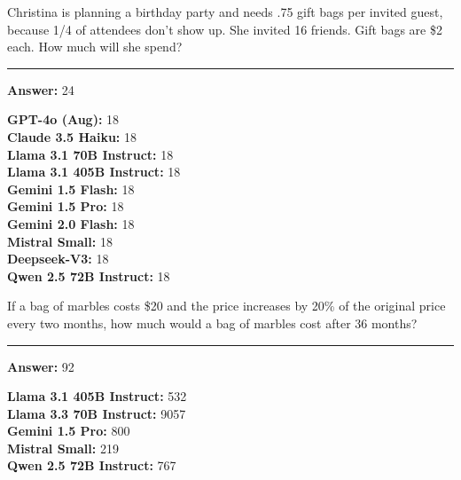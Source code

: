 \begin{tcolorbox}[colback=gray!3, colframe=gray!50, arc=2mm, boxrule=0.5pt, title={\textit{GSM8K}}, coltitle=black, colbacktitle=gray!20]
    
    Christina is planning a birthday party and needs .75 gift bags per invited guest, because 1/4 of attendees don't show up. She invited 16 friends. Gift bags are \$2 each. How much will she spend?

    \noindent
    \begin{center}
        \rule{0.9\textwidth}{0.4pt}
    \end{center}
    
    \textbf{Answer:} 24

    \medskip

    \textbf{GPT-4o (Aug):} 18 \\
    \textbf{Claude 3.5 Haiku:} 18 \\
    \textbf{Llama 3.1 70B Instruct:} 18 \\
    \textbf{Llama 3.1 405B Instruct:} 18 \\
    \textbf{Gemini 1.5 Flash:} 18 \\
    \textbf{Gemini 1.5 Pro:} 18 \\
    \textbf{Gemini 2.0 Flash:} 18 \\
    \textbf{Mistral Small:} 18 \\
     \textbf{Deepseek-V3:} 18 \\
    \textbf{Qwen 2.5 72B Instruct:} 18 \\

\end{tcolorbox}
\vspace{\baselineskip}

\begin{tcolorbox}[colback=gray!3, colframe=gray!50, arc=2mm, boxrule=0.5pt, title={\textit{GSM8K}}, coltitle=black, colbacktitle=gray!20]
    
    If a bag of marbles costs \$20 and the price increases by 20\% of the original price every two months, how much would a bag of marbles cost after 36 months?

    \noindent
    \begin{center}
        \rule{0.9\textwidth}{0.4pt}
    \end{center}
    
    \textbf{Answer:} 92

    \medskip

    \textbf{Llama 3.1 405B Instruct:} 532 \\
    \textbf{Llama 3.3 70B Instruct:} 9057 \\
    \textbf{Gemini 1.5 Pro:} 800 \\
    \textbf{Mistral Small:} 219 \\
    \textbf{Qwen 2.5 72B Instruct:} 767

\end{tcolorbox}
\vspace{\baselineskip}




